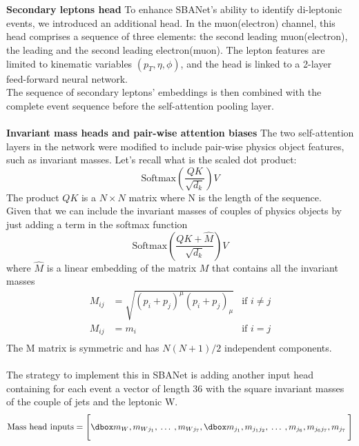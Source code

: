 \\  
\\
\textbf{Secondary leptons head} 
To enhance SBANet's ability to identify di-leptonic events, we introduced an additional head. In the muon(electron) channel, this head comprises a sequence of three elements: the second leading muon(electron), the leading and the second leading electron(muon).
The lepton features are limited to kinematic variables $(p_T,\eta,\phi)$, and the head is linked to a 2-layer feed-forward neural network.\\
The sequence of secondary leptons' embeddings is then combined with the complete event sequence before the self-attention pooling layer.
\\
\\
\textbf{Invariant mass heads and pair-wise attention biases} The two self-attention layers in the network were modified to include pair-wise physics object features, such as invariant masses.
Let's recall what is the scaled dot product:
\begin{equation}
    \text{Softmax}\left( \frac{QK}{\sqrt{d_k}} \right)V
\end{equation}
The product $QK$ is a $N\times N$ matrix where N is the length of the sequence.\\
Given that we can include the invariant masses of couples of physics objects by just adding a term in the softmax function
\begin{equation}
    \text{Softmax}\left( \frac{QK+\hat{M}}{\sqrt{d_k}} \right)V
\end{equation}
where $\hat{M}$ is a linear embedding of the matrix $M$ that contains all the invariant masses
\begin{equation}
\begin{aligned}
    M_{ij}&=\sqrt{(p_i+p_j)^\mu(p_i+p_j)_\mu} & \text{if } i\neq j\\
    M_{ij}&=m_i & \text{if } i=j\\
\end{aligned}
\end{equation}
The M matrix is symmetric and has $N(N+1)/2$ independent components.\\
\\
The strategy to implement this in SBANet is adding another input head containing for each event a vector of length 36 with the square invariant masses of the couple of jets and the leptonic W.
\begin{equation*}
    \text{Mass head inputs}=\Biggl[ \dboxed{m_W,m_{Wj_1},\:\dots\:,m_{Wj_7},\dboxed{m_{j_1},m_{j_1 j_2},\:\dots\:,m_{j_6},m_{j_6 j_7},m_{j_7}}}\: \Biggr]
\end{equation*}
